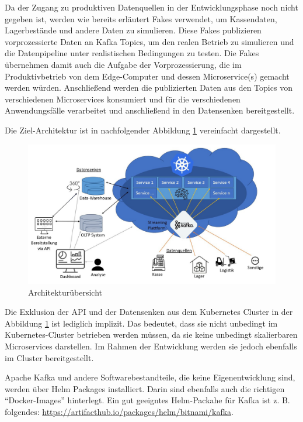 \documentclass[%
pdftex,
oneside,			%
11pt,				%
parskip=half,		%
headheight = 12pt,	%
headsepline,		%
footsepline,		%
footheight = 16pt,	%
abstracton,		%
DIV=calc,		%
BCOR=8mm,		%
headinclude=false,	%
footinclude=false,	%
listof=totoc,		%
toc=bibliography,	%
]{scrreprt}	%
\begin{document}
    Da der Zugang zu produktiven Datenquellen in der Entwicklungsphase noch nicht gegeben ist, werden wie bereits erläutert Fakes verwendet, um Kassendaten, Lagerbestände und andere Daten zu simulieren.
    Diese Fakes publizieren vorprozessierte Daten an Kafka Topics, um den realen Betrieb zu simulieren und die Datenpipeline unter realistischen Bedingungen zu testen.
    Die Fakes übernehmen damit auch die Aufgabe der Vorprozessierung, die im Produktivbetrieb von dem Edge-Computer und dessen Microservice(s) gemacht werden würden.
    Anschließend werden die publizierten Daten aus den Topics von verschiedenen Microservices konsumiert und für die verschiedenen Anwendungsfälle verarbeitet und anschließend in den Datensenken bereitgestellt.

    Die Ziel-Architektur ist in nachfolgender Abbildung \ref{fig:architekturentwurf} vereinfacht dargestellt.

    \begin{figure}[H]
        \centering
        \includegraphics[width=1\textwidth]{assets/architekturentwurf.jpg}
        \caption{Architekturübersicht}
        \label{fig:architekturentwurf}
    \end{figure}

    Die Exklusion der API und der Datensenken aus dem Kubernetes Cluster in der Abbildung \ref{fig:architekturentwurf} ist lediglich implizit.
    Das bedeutet, dass sie nicht unbedingt im Kubernetes-Cluster betrieben werden müssen, da sie keine unbedingt skalierbaren Microservices darstellen.
    Im Rahmen der Entwicklung werden sie jedoch ebenfalls im Cluster bereitgestellt.

    Apache Kafka und andere Softwarebestandteile, die keine Eigenentwicklung sind, werden über Helm Packages installiert.
    Darin sind ebenfalls auch die richtigen \enquote{Docker-Images} hinterlegt.
    Ein gut geeigntes Helm-Packahe für Kafka ist z. B. folgendes: \url{https://artifacthub.io/packages/helm/bitnami/kafka}.
\end{document}
